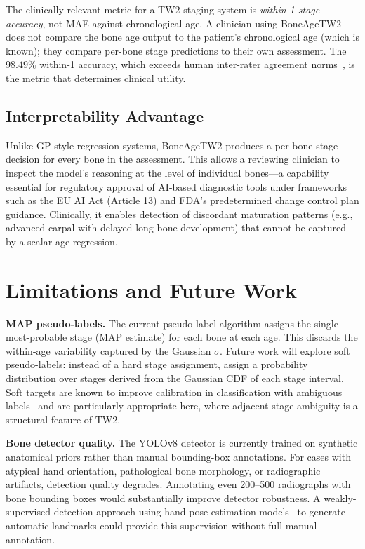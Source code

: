 \documentclass[journal]{IEEEtran}
\begin{document}
The clinically relevant metric for a TW2 staging system is
\textit{within-1 stage accuracy}, not MAE against chronological age.
A clinician using BoneAgeTW2 does not compare the bone age output
to the patient's chronological age (which is known); they compare
per-bone stage predictions to their own assessment.
The $98.49\%$ within-1 accuracy, which exceeds human inter-rater
agreement norms~\cite{king1994}, is the metric that determines
clinical utility.

\subsection{Interpretability Advantage}

Unlike GP-style regression systems, BoneAgeTW2 produces a
per-bone stage decision for every bone in the assessment.
This allows a reviewing clinician to inspect the model's reasoning
at the level of individual bones—a capability essential for
regulatory approval of AI-based diagnostic tools under frameworks
such as the EU AI Act (Article 13) and FDA's predetermined change
control plan guidance.
Clinically, it enables detection of discordant maturation patterns
(e.g., advanced carpal with delayed long-bone development)
that cannot be captured by a scalar age regression.

\section{Limitations and Future Work}
\label{sec:limitations}

\textbf{MAP pseudo-labels.}
The current pseudo-label algorithm assigns the single most-probable
stage (MAP estimate) for each bone at each age.
This discards the within-age variability captured by the Gaussian
$\sigma$.
Future work will explore soft pseudo-labels: instead of a hard
stage assignment, assign a probability distribution over stages
derived from the Gaussian CDF of each stage interval.
Soft targets are known to improve calibration in classification
with ambiguous labels~\cite{hinton2015} and are particularly
appropriate here, where adjacent-stage ambiguity is a structural
feature of TW2.

\textbf{Bone detector quality.}
The YOLOv8 detector is currently trained on synthetic anatomical
priors rather than manual bounding-box annotations.
For cases with atypical hand orientation, pathological bone morphology,
or radiographic artifacts, detection quality degrades.
Annotating even 200--500 radiographs with bone bounding boxes
would substantially improve detector robustness.
A weakly-supervised detection approach using hand pose estimation
models~\cite{escobar2019} to generate automatic landmarks could
provide this supervision without full manual annotation.
\end{document}
